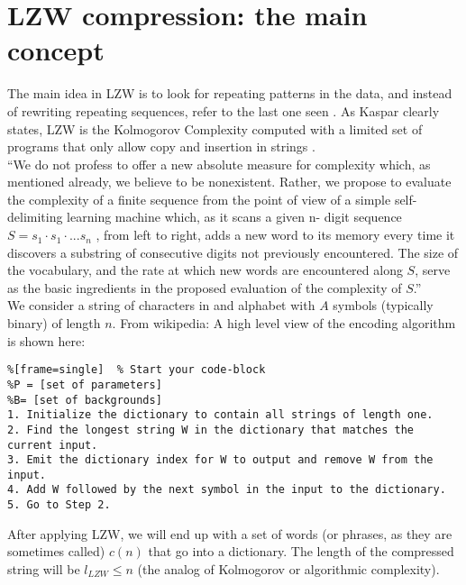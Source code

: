\documentclass[11pt]{amsart}
\begin{document}
\clearpage

\section{LZW compression: the main concept}

The main idea in LZW is to look for repeating patterns in the data, and instead of rewriting repeating sequences, refer to the last one seen \cite{Lempel:1976aa}.  As Kaspar clearly states, LZW is the Kolmogorov Complexity computed with a limited set of programs that only allow copy and insertion in strings \cite{Kaspar:1987aa, Ruffini:2016ad}. \\


``We do not profess to offer a new absolute measure for complexity which, as mentioned already, we believe to be nonexistent. Rather, we propose to evaluate the complexity of a finite sequence from the point of view of a simple self- delimiting learning machine which, as it scans a given n- digit sequence $S=s_{1}\cdot s_{1} \cdot ... s_{n}$ , from left to right, adds a new word to its memory every time it discovers a substring of consecutive digits not previously encountered.  The size of the vocabulary, and the rate at which new words are encountered along $S$, serve as the basic ingredients in the proposed evaluation of the complexity of $S$.''\\

We consider a string of characters in and alphabet with $A$ symbols (typically binary) of length $n$. 
From wikipedia:  A high level view of the encoding algorithm is shown here:

 {\footnotesize
\begin{lstlisting}%[frame=single]  % Start your code-block
%P = [set of parameters]
%B= [set of backgrounds]
1. Initialize the dictionary to contain all strings of length one.
2. Find the longest string W in the dictionary that matches the current input.
3. Emit the dictionary index for W to output and remove W from the input.
4. Add W followed by the next symbol in the input to the dictionary.
5. Go to Step 2.
\end{lstlisting}
}

After applying LZW, we will end up with a set of words (or phrases, as they are sometimes called)  $c(n)$ that go into a dictionary. The length of the compressed string will be $l_{LZW} \leq n$ (the analog of Kolmogorov or algorithmic complexity).  \\
\end{document}
